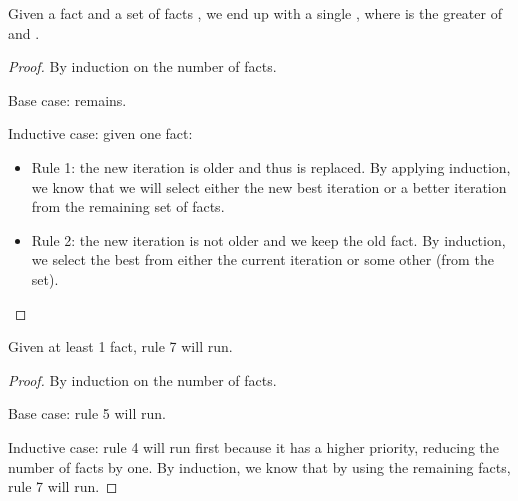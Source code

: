 \begin{lemma}

Given a fact  and a set of facts
, we end up with a single
, where  is the greater of
 and .

\end{lemma}
\begin{proof}
By induction on the number of  facts.

Base case:  remains.

Inductive case: given one  fact:

\begin{itemize}
   \item Rule 1: the new iteration is older and thus 
   is replaced. By applying induction, we know that we will select either the
   new best iteration or a better iteration from the remaining set of
    facts.
   \item Rule 2: the new iteration is not older and we keep the old
    fact. By induction, we select the best from either
   the current iteration or some other (from the set).
\end{itemize}
\end{proof}

\begin{lemma}
Given at least 1  fact, rule 7 will run.
\end{lemma}
\begin{proof}
By induction on the number of  facts.

Base case: rule 5 will run.

Inductive case: rule 4 will run first because it has a higher priority, reducing
the number of  facts by one. By induction, we know that by
using the remaining  facts, rule 7 will run.
\end{proof}

